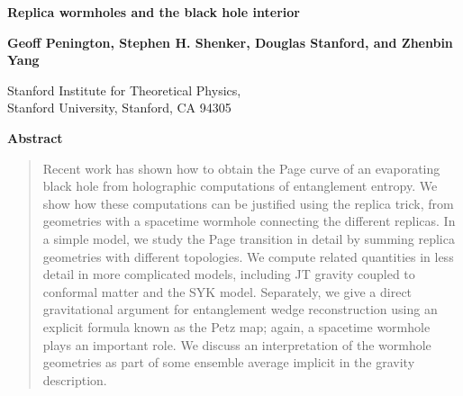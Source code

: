 \documentclass[11pt]{article}
\numberwithin{equation}{section}
\begin{document}
\thispagestyle{empty}


\vspace*{.5cm}
\begin{center}



{\bf {\LARGE Replica wormholes and the black hole interior}}

\begin{center}

\vspace{1cm}


 {\bf Geoff Penington, Stephen H. Shenker, Douglas Stanford, and Zhenbin Yang}\\
  \bigskip \rm
  
\bigskip
Stanford Institute for Theoretical Physics,\\Stanford University, Stanford, CA 94305

\rm
  \end{center}

\vspace{2.5cm}
{\bf Abstract}
\end{center}
\begin{quotation}
\noindent

Recent work has shown how to obtain the Page curve of an evaporating black hole from holographic computations of entanglement entropy. We show how these computations can be justified using the replica trick, from geometries with a spacetime wormhole connecting the different replicas. In a simple model, we study the Page transition in detail by summing replica geometries with different topologies. We  compute related quantities  in less detail in more complicated models, including JT gravity coupled to conformal matter and the SYK model. Separately, we give a direct gravitational argument for entanglement wedge reconstruction using an explicit formula known as the Petz map; again, a spacetime wormhole plays an important role. We discuss an interpretation of the wormhole geometries as part of some ensemble average implicit in the gravity description.

\end{quotation}

\setcounter{page}{0}
\setcounter{tocdepth}{2}
\setcounter{footnote}{0}
\newpage

\tableofcontents

\pagebreak
\end{document}

